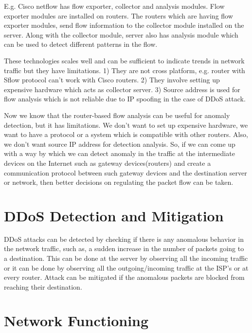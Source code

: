 \documentclass[12pt,oneside,a4paper]{article}
\begin{document}
E.g. Cisco netflow has flow exporter, collector and analysis modules. Flow exporter modules are installed on routers. The routers which are having flow exporter modules, send flow information to the collector module installed on the server. Along with the collector module, server also has analysis module which can be used to detect different patterns in the flow.\par

These technologies scales well and can be sufficient to indicate trends in network traffic but they have limitations. 1) They are not cross platform, e.g. router with Sflow protocol can't work with Cisco routers. 2) They involve setting up expensive hardware which acts as collector server. 3) Source address is used for flow analysis which is not reliable due to IP spoofing in the case of DDoS attack.\par

Now we know that the router-based flow analysis can be useful for anomaly detection, but it has limitations. We don't want to set up expensive hardware, we want to have a protocol or a system which is compatible with other routers. Also, we don't want source IP address for detection analysis. So, if we can come up with a way by which we can detect anomaly in the traffic at the intermediate devices on the Internet such as gateway devices(routers) and create a communication protocol between such gateway devices and the destination server or network, then better decisions on regulating the packet flow can be taken.

\section{DDoS Detection and Mitigation}

DDoS attacks can be detected by checking if there is any anomalous behavior in the network traffic, such as, a sudden increase in the number of packets going to a destination. This can be done at the server by observing all the incoming traffic or it can be done by observing all the outgoing/incoming traffic at the ISP's or at every router. Attack can be mitigated if the anomalous packets are blocked from reaching their destination.

\section{Network Functioning}
\end{document}
